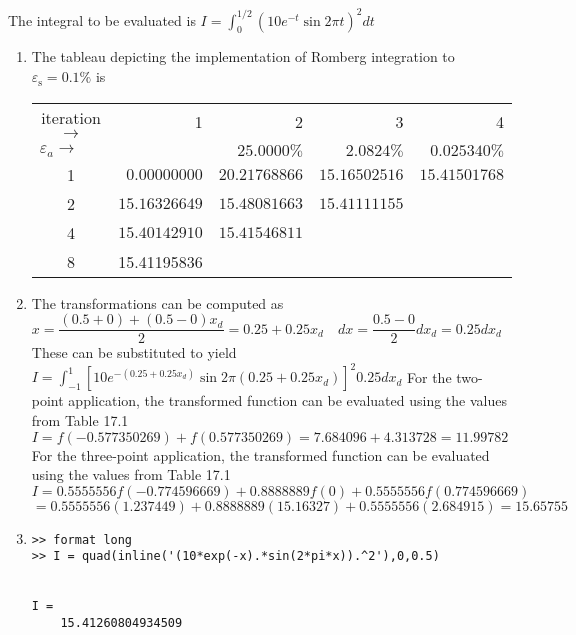 \documentclass[../main.tex]{subfiles}
\begin{document}
\section{}
The integral to be evaluated is
	\bigbreak
$\displaystyle I=\int_{0}^{1 / 2}\left(10 e^{-t} \sin 2 \pi t\right)^{2} d t$
	\bigbreak
\begin{enumerate}[label=\bfseries(\alph*)]
\item The tableau depicting the implementation of Romberg integration to $\varepsilon_{\mathrm{s}}=0.1 \%$ is
	\bigbreak
\begin{tabular}{lrrrr}
\multicolumn{1}{c}{iteration $\rightarrow$} & 1 & 2 & 3 & 4 \\
$\varepsilon_{a} \rightarrow$ &  & $25.0000 \%$ & $2.0824 \%$ & $0.025340 \%$ \\
\multicolumn{1}{c}{1} & $0.00000000$ & $20.21768866$ & $15.16502516$ & $15.41501768$ \\
\multicolumn{1}{c}{2} & $15.16326649$ & $15.48081663$ & $15.41111155$ &  \\
\multicolumn{1}{c}{4} & $15.40142910$ & $15.41546811$ &  &  \\
\multicolumn{1}{c}{8} & 15.41195836\\
\end{tabular}
	\bigbreak
\item The transformations can be computed as
	\bigbreak
$x=\dfrac{(0.5+0)+(0.5-0) x_{d}}{2}=0.25+0.25 x_{d} \quad d x=\dfrac{0.5-0}{2} d x_{d}=0.25 d x_{d}$
	\bigbreak
These can be substituted to yield
	\bigbreak
$\displaystyle I=\int_{-1}^{1}\left[10 e^{-\left(0.25+0.25 x_{d}\right)} \sin 2 \pi\left(0.25+0.25 x_{d}\right)\right]^{2} 0.25 d x_{d}$
	\bigbreak
For the two-point application, the transformed function can be evaluated using the values from Table 17.1
	\bigbreak
$I=f(-0.577350269)+f(0.577350269)=7.684096+4.313728=11.99782$
	\bigbreak
For the three-point application, the transformed function can be evaluated using the values from Table 17.1
	\bigbreak
$I=0.5555556f(-0.774596669)+0.8888889f(0)+0.5555556f(0.774596669)$
	\bigbreak
$=0.5555556(1.237449)+0.8888889(15.16327)+0.5555556(2.684915)=15.65755$
	\bigbreak
\item
\begin{lstlisting}[numbers=none]
>> format long
>> I = quad(inline('(10*exp(-x).*sin(2*pi*x)).^2'),0,0.5)


I =
	15.41260804934509 
\end{lstlisting}
\end{enumerate}
\end{document}
